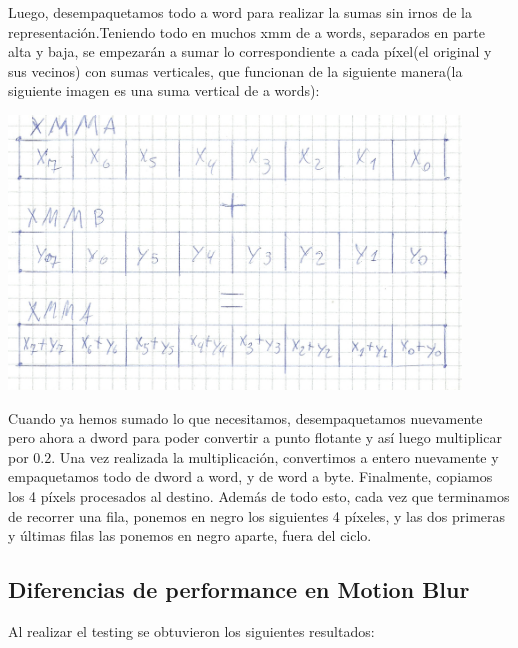 \documentclass[a4paper]{article}
\begin{document}
Luego, desempaquetamos todo a word para realizar la sumas sin irnos de la representación.Teniendo todo en muchos xmm de a words, separados en parte alta y baja, se empezarán a sumar lo correspondiente a cada píxel(el original y sus vecinos) con sumas verticales, que funcionan de la siguiente manera(la siguiente imagen es una suma vertical de a words):

\begin{center}
\includegraphics[width=0.9\textwidth]{Dibujos/sv.jpg}
\end{center}

Cuando ya hemos sumado lo que necesitamos, desempaquetamos nuevamente pero ahora a dword para poder convertir a punto flotante y así luego multiplicar por $0.2$. Una vez realizada la multiplicación, convertimos a entero nuevamente y empaquetamos todo de dword a word, y de word a byte. Finalmente, copiamos los 4 píxels procesados al destino. Además de todo esto, cada vez que terminamos de recorrer una fila, ponemos en negro los siguientes 4 píxeles, y las dos primeras y últimas filas las ponemos en negro aparte, fuera del ciclo.

\subsection{Diferencias de performance en Motion Blur}

Al realizar el testing se obtuvieron los siguientes resultados:
\end{document}
